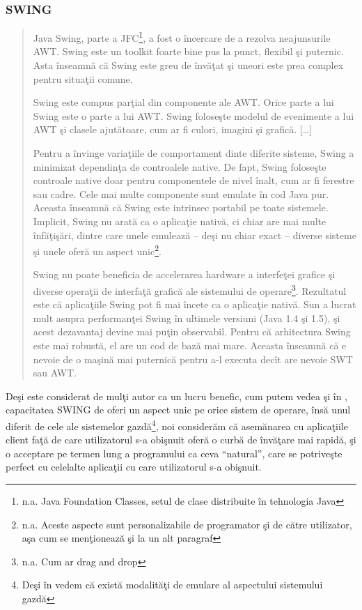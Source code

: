 \subsubsection{SWING}

\begin{quotation}
Java Swing, parte a JFC\footnote{n.a. Java Foundation Classes, setul de clase
distribuite în tehnologia Java}, a fost o încercare de a rezolva neajunsurile
AWT. Swing este un toolkit foarte bine pus la punct, flexibil şi puternic. Asta
înseamnă că Swing este greu de învăţat şi uneori este prea complex pentru
situaţii comune.

Swing este compus parţial din componente ale AWT. Orice parte a lui Swing este o
parte a lui AWT. Swing foloseşte modelul de evenimente a lui AWT şi clasele
ajutătoare, cum ar fi culori, imagini şi grafică. [\ldots]

Pentru a învinge variaţiile de comportament dinte diferite sisteme, Swing a 
minimizat dependinţa de controalele native. De fapt, Swing foloseşte controale 
native doar pentru componentele de nivel înalt, cum ar fi ferestre sau cadre. 
Cele mai multe componente sunt emulate în cod Java pur. Aceasta înseamnă că 
Swing este intrinsec portabil pe toate sistemele. Implicit, Swing nu arată ca o 
aplicaţie nativă, ci chiar are mai multe înfăţişări, dintre care unele emulează 
-- deşi nu chiar exact -- diverse sisteme şi unele oferă un aspect 
unic\footnote{n.a. Aceste aspecte sunt personalizabile de programator şi de 
către utilizator, aşa cum se menţionează şi \cite{swtawtswing} la un alt 
paragraf}.

Swing nu poate beneficia de accelerarea hardware a interfeţei grafice şi diverse
operaţii de interfaţă grafică ale sistemului de operare\footnote{n.a. Cum ar
drag and drop}. Rezultatul este că aplicaţiile Swing pot fi mai încete ca o
aplicaţie nativă. Sun a lucrat mult asupra performanţei Swing în ultimele
versiuni (Java 1.4 şi 1.5), şi acest dezavantaj devine mai puţin observabil.
Pentru că arhitectura Swing este mai robustă, el are un cod de bază mai mare.
Aceasta înseamnă că e nevoie de o maşină mai puternică pentru a-l executa decît
are nevoie SWT sau AWT.
\cite{swtawtswing}
\end{quotation}

Deşi este considerat de mulţi autor ca un lucru benefic, cum putem vedea şi în
\cite{killswt}, capacitatea SWING de oferi un aspect unic pe orice sistem de
operare, însă unul diferit de cele ale sistemelor gazdă\footnote{Deşi în
\cite{killswt} vedem că există modalităţi de emulare al aspectului sistemului
gazdă}, noi considerăm că asemănarea cu aplicaţiile client faţă de care
utilizatorul s-a obişnuit oferă o curbă de învăţare mai rapidă, şi o acceptare
pe termen lung a programului ca ceva ``natural'', care se potriveşte perfect cu
celelalte aplicaţii cu care utilizatorul s-a obişnuit.

